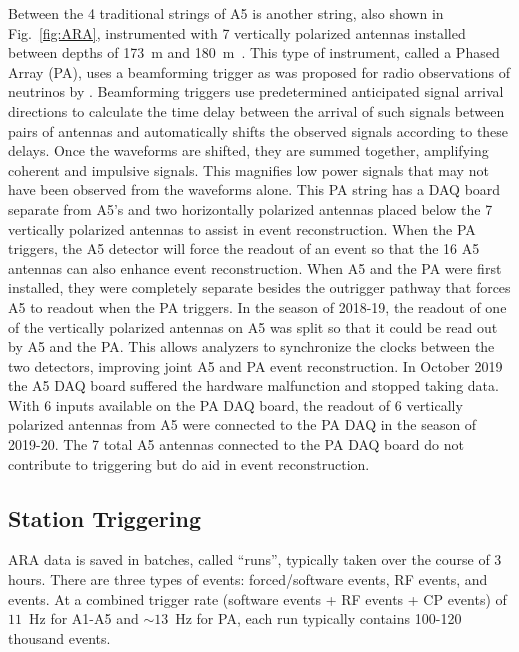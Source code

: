       Between the 4 traditional strings of A5 is another string, also shown in Fig.~\ref{fig:ARA}, instrumented with 7 vertically polarized antennas installed between depths of 173~m and 180~m~\citep{ara_pa_design}.
      This type of instrument, called a Phased Array (PA), uses a beamforming trigger as was proposed for radio observations of neutrinos by \citep{phased-array-concept}.
      Beamforming triggers use predetermined anticipated signal arrival directions to calculate the time delay between the arrival of such signals between pairs of antennas and automatically shifts the observed signals according to these delays.%
      Once the waveforms are shifted, they are summed together, amplifying coherent and impulsive signals.
      This magnifies low power signals that may not have been observed from the waveforms alone.
      This PA string has a DAQ board separate from A5's and two horizontally polarized antennas placed below the 7 vertically polarized antennas to assist in event reconstruction.
      When the PA triggers, the A5 detector will force the readout of an event so that the 16 A5 antennas can also enhance event reconstruction.
      When A5 and the PA were first installed, they were completely separate besides the outrigger pathway that forces A5 to readout when the PA triggers. 
      In the season of 2018-19, the readout of one of the vertically polarized antennas on A5 was split so that it could be read out by A5 and the PA. 
      This allows analyzers to synchronize the clocks between the two detectors, improving joint A5 and PA event reconstruction.
      In October 2019 the A5 DAQ board suffered the hardware malfunction and stopped taking data. 
      With 6 inputs available on the PA DAQ board, the readout of 6 vertically polarized antennas from A5 were connected to the PA DAQ in the season of 2019-20.
      The 7 total A5 antennas connected to the PA DAQ board do not contribute to triggering but do aid in event reconstruction.

  \subsection{Station Triggering \label{sec:triggering}}

    ARA data is saved in batches, called ``runs'', typically taken over the course of 3 hours.
    There are three types of events: forced/software events, RF events, and events. 
    At a combined trigger rate (software events + RF events + CP events) of $ \! 11$~Hz for A1-A5 and $\sim \! 13$~Hz for PA, each run typically contains 100-120 thousand events. 

